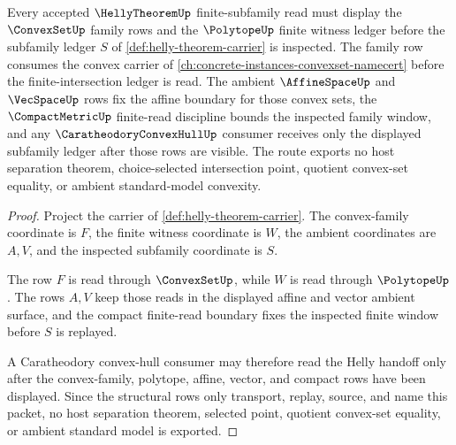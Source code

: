 \begin{theorem}
\label{thm:helly-convex-family-dependency-route}
Every accepted $\HellyTheoremUp$ finite-subfamily read must display the $\ConvexSetUp$ family rows and the $\PolytopeUp$ finite witness ledger before the subfamily ledger $S$ of \autoref{def:helly-theorem-carrier} is inspected. The family row consumes the convex carrier of \autoref{ch:concrete-instances-convexset-namecert} before the finite-intersection ledger is read. The ambient $\AffineSpaceUp$ and $\VecSpaceUp$ rows fix the affine boundary for those convex sets, the $\CompactMetricUp$ finite-read discipline bounds the inspected family window, and any $\CaratheodoryConvexHullUp$ consumer receives only the displayed subfamily ledger after those rows are visible. The route exports no host separation theorem, choice-selected intersection point, quotient convex-set equality, or ambient standard-model convexity.
\end{theorem}
\begin{proof}
Project the carrier of \autoref{def:helly-theorem-carrier}. The convex-family coordinate is $F$, the finite witness coordinate is $W$, the ambient coordinates are $A,V$, and the inspected subfamily coordinate is $S$.

The row $F$ is read through $\ConvexSetUp$, while $W$ is read through $\PolytopeUp$. The rows $A,V$ keep those reads in the displayed affine and vector ambient surface, and the compact finite-read boundary fixes the inspected finite window before $S$ is replayed.

A Caratheodory convex-hull consumer may therefore read the Helly handoff only after the convex-family, polytope, affine, vector, and compact rows have been displayed. Since the structural rows only transport, replay, source, and name this packet, no host separation theorem, selected point, quotient convex-set equality, or ambient standard model is exported.
\end{proof}
